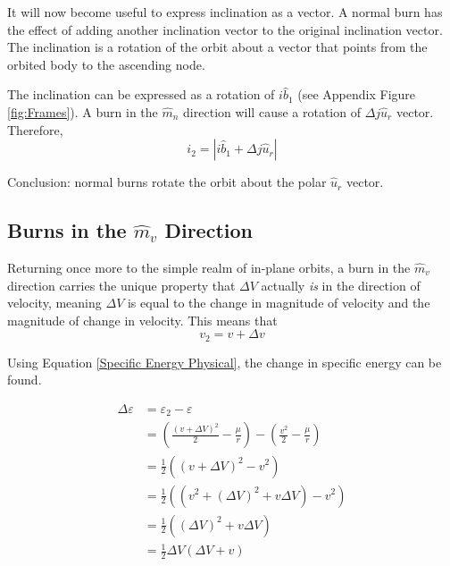 \documentclass{article}
\begin{document}
It will now become useful to express inclination as a vector. A normal burn has the effect of adding another inclination vector to the original inclination vector. The inclination is a rotation of the orbit about a vector that points from the orbited body to the ascending node.

The inclination can be expressed as a rotation of $i\hat{b}_1$ (see Appendix Figure \ref{fig:Frames}). A burn in the $\hat{m}_n$ direction will cause a rotation of $\Delta j\hat{u}_r$ vector. Therefore,
$$i_2=|i\hat{b}_1+\Delta j\hat{u}_r|$$

Conclusion: normal burns rotate the orbit about the polar $\hat{u}_r$ vector.

\bigskip\bigskip
\subsection{Burns in the \texorpdfstring{$\hat{m}_v$}{Velocity} Direction}

Returning once more to the simple realm of in-plane orbits, a burn in the $\hat{m}_v$ direction carries the unique property that $\Delta V$ actually \textit{is} in the direction of velocity, meaning $\Delta V$ is equal to the change in magnitude of velocity and the magnitude of change in velocity. This means that
$$v_2=v+\Delta v$$

Using Equation \eqref{Specific Energy Physical}, the change in specific energy can be found.

\begin{align*}
    \Delta \varepsilon & = \varepsilon_2 - \varepsilon                                                                        \\
                       & = \left(\frac{(v+\Delta V)^2}{2}-\frac{\mu{}}{r}\right) - \left(\frac{v^2}{2}-\frac{\mu{}}{r}\right) \\
                       & = \frac{1}{2}\left(\left(v+\Delta V\right)^2-v^2\right)                                              \\
                       & = \frac{1}{2}\left(\left(v^2+(\Delta V)^2+v\Delta V\right)-v^2\right)                                \\
                       & = \frac{1}{2}\left((\Delta V)^2+v\Delta V\right)                                                     \\
                       & = \frac{1}{2}\Delta V\left(\Delta V+v\right)                                                         \\
\end{align*}
\end{document}
